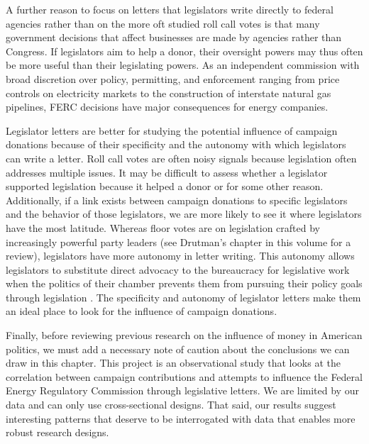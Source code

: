\documentclass{article}
\begin{document}
A further reason to focus on letters that legislators write directly to federal agencies rather than on the more oft studied roll call votes is that many government decisions that affect businesses are made by agencies rather than Congress. If legislators aim to help a donor, their oversight powers may thus often be more useful than their legislating powers. As an independent commission with broad discretion over policy, permitting, and enforcement ranging from price controls on electricity markets to the construction of interstate natural gas pipelines, FERC decisions have major consequences for energy companies.

Legislator letters are better for studying the potential influence of campaign donations because of their specificity and the autonomy with which legislators can write a letter. Roll call votes are often noisy signals because legislation often addresses multiple issues. It may be difficult to assess whether a legislator supported legislation because it helped a donor or for some other reason.  Additionally, if a link exists between campaign donations to specific legislators and the behavior of those legislators,  we are more likely to see it where legislators have the most latitude. Whereas floor votes are on legislation crafted by increasingly powerful party leaders (see Drutman's chapter in this volume for a review), legislators have more autonomy in letter writing. This autonomy allows legislators to substitute direct advocacy to the bureaucracy for legislative work when the politics of their chamber prevents them from pursuing their policy goals through legislation \citep{Ritchie2017}. The specificity and autonomy of legislator letters make them an ideal place to look for the influence of campaign donations. 

Finally, before reviewing previous research on the influence of money in American politics, we must add a necessary note of caution about the conclusions we can draw in this chapter.  This project is an observational study that looks at the correlation between campaign contributions and attempts to influence the Federal Energy Regulatory Commission through legislative letters.  We are limited by our data and can only use cross-sectional designs.  That said, our results suggest interesting patterns that deserve to be interrogated with data that enables more robust research designs. %
\end{document}
